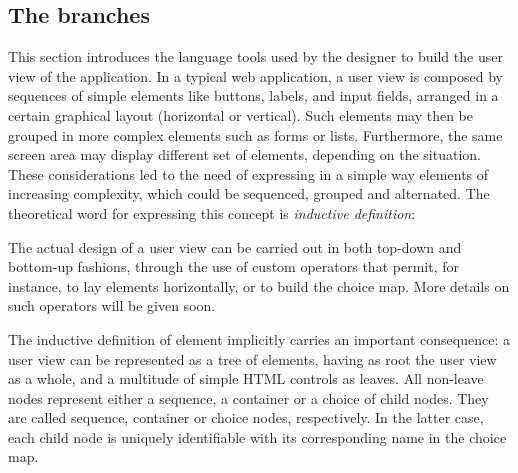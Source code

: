 \documentclass[12pt]{article} %
\newcounter{dccounter}
\newenvironment{dce}[3]
	{\refstepcounter{dccounter}\begin{tcolorbox}[colback=red!5!white,colframe=red!75!black,fonttitle=\bfseries,
size=small,righthand width=3cm,sidebyside,sidebyside align=center seam,lower separated=false,title=Design choice \thedccounter: \emph{#1}\label{#2}]}
	{\tcblower
     \texttt{[image: tree]}%
    \end{tcolorbox}}
\begin{document}
\subsection{The branches}\label{branches}
This section introduces the language tools used by the designer to build the user view of the application. In a typical web application, a user view is composed by sequences of simple elements like buttons, labels, and input fields, arranged in a certain graphical layout (horizontal or vertical). Such elements may then be grouped in more complex elements such as forms or lists. Furthermore, the same screen area may display different set of elements, depending on the situation. These considerations led to the need of expressing in a simple way elements of increasing complexity, which could be sequenced, grouped and alternated. The theoretical word for expressing this concept is \emph{inductive definition}:
The actual design of a user view can be carried out in both top-down and bottom-up fashions, through the use of custom operators that permit, for instance, to lay elements horizontally, or to build the choice map. More details on such operators will be given soon.

The inductive definition of element implicitly carries an important consequence: a user view can be represented as a tree of elements, having as root the user view as a whole, and a multitude of simple HTML controls as leaves. All non-leave nodes represent either a sequence, a container or a choice of child nodes. They are called sequence, container or choice nodes, respectively. In the latter case, each child node is uniquely identifiable with its corresponding name in the choice map.
\end{document}
